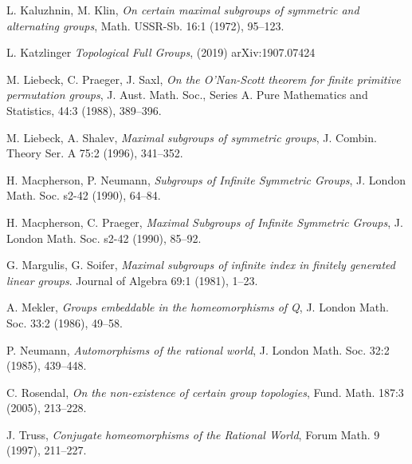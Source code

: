 \documentclass[11pt]{amsart}
\theoremstyle{definition}
\begin{document}
\begin{thebibliography}{}
L. Kaluzhnin, M. Klin,
{\em On certain maximal subgroups of symmetric and alternating groups},
Math. USSR-Sb. 16:1 (1972), 95--123.

L. Katzlinger {\em Topological Full Groups}, (2019) arXiv:1907.07424



 M. Liebeck, C. Praeger, J. Saxl, {\em On the O’Nan-Scott theorem for finite primitive permutation groups}, J. Aust. Math. Soc., Series A. Pure Mathematics and Statistics, 44:3 (1988), 389--396. 


M. Liebeck, A. Shalev,
{\em Maximal subgroups of symmetric groups},
J. Combin. Theory Ser. A 75:2 (1996), 341--352.


H. Macpherson, P. Neumann,
{\em Subgroups of Infinite Symmetric Groups},
J. London Math. Soc. s2-42 (1990), 64--84.

H. Macpherson, C. Praeger,
{\em Maximal Subgroups of Infinite Symmetric Groups},
J. London Math. Soc. s2-42 (1990), 85--92.


G. Margulis, G. Soifer, {\em Maximal subgroups of infinite index in finitely
generated linear groups}. Journal of Algebra 69:1 (1981), 1--23.


A. Mekler, {\em Groups embeddable in the homeomorphisms of Q}, J. London Math. Soc. 33:2 (1986), 49--58.





P. Neumann,  {\em Automorphisms of the rational world}, J. London Math. Soc. 32:2 (1985), 439--448.

C. Rosendal,
{\em On the non-existence of certain group topologies},
Fund. Math. 187:3 (2005), 213--228.


J. Truss, {\em Conjugate homeomorphisms of the Rational World}, Forum Math. 9 (1997), 211--227. 






  










\end{thebibliography}
\end{document}
